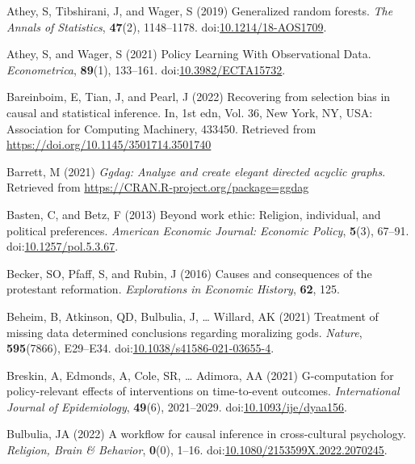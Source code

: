\documentclass[
  singlecolumn,
  9pt]{article}
\newlength{\cslentryspacing}
\begin{document}
\label{refs}
\setlength{\cslentryspacing}{0em}
\begin{CSLReferences}
Athey, S, Tibshirani, J, and Wager, S (2019) Generalized random forests.
\emph{The Annals of Statistics}, \textbf{47}(2), 1148--1178.
doi:\href{https://doi.org/10.1214/18-AOS1709}{10.1214/18-AOS1709}.

Athey, S, and Wager, S (2021) Policy Learning With Observational Data.
\emph{Econometrica}, \textbf{89}(1), 133--161.
doi:\href{https://doi.org/10.3982/ECTA15732}{10.3982/ECTA15732}.

Bareinboim, E, Tian, J, and Pearl, J (2022) Recovering from selection
bias in causal and statistical inference. In, 1st edn, Vol. 36, New
York, NY, USA: Association for Computing Machinery, 433450. Retrieved
from \url{https://doi.org/10.1145/3501714.3501740}

Barrett, M (2021) \emph{Ggdag: Analyze and create elegant directed
acyclic graphs}. Retrieved from
\url{https://CRAN.R-project.org/package=ggdag}

Basten, C, and Betz, F (2013) Beyond work ethic: Religion, individual,
and political preferences. \emph{American Economic Journal: Economic
Policy}, \textbf{5}(3), 67--91.
doi:\href{https://doi.org/10.1257/pol.5.3.67}{10.1257/pol.5.3.67}.

Becker, SO, Pfaff, S, and Rubin, J (2016) Causes and consequences of the
protestant reformation. \emph{Explorations in Economic History},
\textbf{62}, 125.

Beheim, B, Atkinson, QD, Bulbulia, J, \ldots{} Willard, AK (2021)
Treatment of missing data determined conclusions regarding moralizing
gods. \emph{Nature}, \textbf{595}(7866), E29--E34.
doi:\href{https://doi.org/10.1038/s41586-021-03655-4}{10.1038/s41586-021-03655-4}.

Breskin, A, Edmonds, A, Cole, SR, \ldots{} Adimora, AA (2021)
G-computation for policy-relevant effects of interventions on
time-to-event outcomes. \emph{International Journal of Epidemiology},
\textbf{49}(6), 2021--2029.
doi:\href{https://doi.org/10.1093/ije/dyaa156}{10.1093/ije/dyaa156}.

Bulbulia, JA (2022) A workflow for causal inference in cross-cultural
psychology. \emph{Religion, Brain \& Behavior}, \textbf{0}(0), 1--16.
doi:\href{https://doi.org/10.1080/2153599X.2022.2070245}{10.1080/2153599X.2022.2070245}.


\end{CSLReferences}
\end{document}
